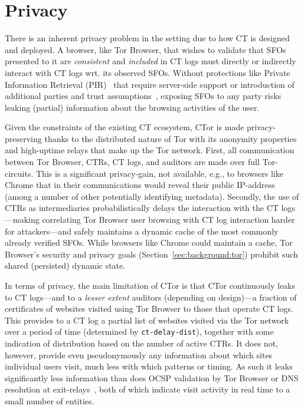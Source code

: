 \section{Privacy} \label{sec:privacy}
There is an inherent privacy problem in the setting due to how CT is designed
and deployed. A browser, like Tor Browser, that wishes to validate that SFOs presented to
it are \emph{consistent} and \emph{included} in CT logs must directly or
indirectly interact with CT logs wrt. its observed SFOs. Without protections
like Private Information Retrieval (PIR)~\cite{PIR} that require server-side
support or introduction of additional parties and trust
assumptions~\cite{lueks-and-goldberg,kales}, exposing SFOs to any party risks
leaking (partial) information about the browsing activities of the user.

Given the constraints of the existing CT ecosystem, CTor is made
privacy-preserving thanks to the distributed nature of Tor with its anonymity
properties and high-uptime relays that make up the Tor network. First, all
communication between Tor Browser, CTRs, CT logs, and auditors are made over
full Tor-circuits. This is a significant privacy-gain, not available, e.g., to
browsers like Chrome that in their communications would reveal their public
IP-address (among a number of other potentially identifying metadata). Secondly,
the use of CTRs as intermediaries probabilistically delays the interaction with
the CT logs---making correlating Tor Browser user browsing with CT log
interaction harder for attackers---and safely maintains a dynamic cache of the
most commonly already verified SFOs. While browsers like Chrome could maintain a
cache, Tor Browser's security and privacy goals
(Section~\ref{sec:background:tor}) prohibit such shared (persisted) dynamic
state.

In terms of privacy, the main limitation of CTor is that CTor continuously leaks
to CT logs---and to a \emph{lesser extent} auditors (depending on design)---a
fraction of certificates of websites visited using Tor Browser to those that
operate CT logs. This provides to a CT log a partial list of websites visited
via the Tor network over a period of time (determined by
\texttt{ct-delay-dist}), together with some indication of distribution based on
the number of active CTRs. It does not, however, provide even pseudonymously any
information about which sites individual users visit, much less with which
patterns or timing. As such it leaks significantly less information than does
OCSP validation by Tor Browser or DNS resolution at exit-relays~\cite{TorDNS},
both of which indicate visit activity in real time to a small number of
entities.


